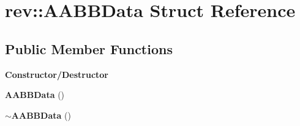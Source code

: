 \hypertarget{structrev_1_1_a_a_b_b_data}{}\section{rev\+::A\+A\+B\+B\+Data Struct Reference}
\label{structrev_1_1_a_a_b_b_data}
\subsection*{Public Member Functions}
\begin{Indent}\textbf{ Constructor/\+Destructor}\par
\begin{DoxyCompactItemize}
\item 
\mbox{\label{structrev_1_1_a_a_b_b_data_a77e39a0f4e9873c22899ef97d4478259}} 
{\bfseries A\+A\+B\+B\+Data} ()
\item 
\mbox{\label{structrev_1_1_a_a_b_b_data_a74036fb00cca763fabaa50749c8d7fe3}} 
{\bfseries $\sim$\+A\+A\+B\+B\+Data} ()
\end{DoxyCompactItemize}
\end{Indent}
